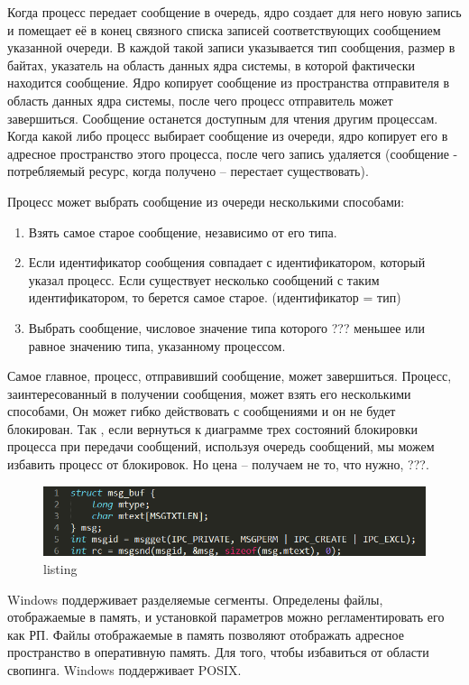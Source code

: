 Когда процесс передает сообщение в очередь, ядро создает для него новую запись и помещает её в конец связного списка записей соответствующих сообщением указанной очереди. В каждой такой записи указывается тип сообщения, размер в байтах, указатель на область данных ядра системы, в которой фактически находится сообщение. Ядро копирует сообщение из пространства отправителя в область данных ядра системы, после чего процесс отправитель может завершиться. Сообщение останется доступным для чтения другим процессам. Когда какой либо процесс выбирает сообщение из очереди, ядро копирует его в адресное пространство этого процесса, после чего запись удаляется (сообщение - потребляемый ресурс, когда получено – перестает существовать). 

Процесс может выбрать сообщение из очереди несколькими способами:
\begin{enumerate}
    \item Взять самое старое сообщение, независимо от его типа.
    \item Если идентификатор сообщения совпадает с идентификатором, который указал процесс. Если существует несколько сообщений с таким идентификатором, то берется самое старое. (идентификатор = тип)
    \item Выбрать сообщение, числовое значение типа которого ??? меньшее или равное значению типа, указанному процессом. 
\end{enumerate} 

Самое главное, процесс, отправивший сообщение, может завершиться. Процесс, заинтересованный в получении сообщения, может взять его несколькими способами, Он может гибко действовать с сообщениями и он не будет блокирован. Так , если вернуться к диаграмме трех состояний блокировки процесса при передачи сообщений, используя очередь сообщений, мы можем избавить процесс от блокировок. Но цена – получаем не то, что нужно, ???.

\begin{figure}[H]
    \centering
    \includegraphics[width=\textwidth]{listing/4.png}
    \caption{listing}
\end{figure}

Windows поддерживает разделяемые сегменты. Определены файлы, отображаемые в память, и установкой параметров можно регламентировать его как РП.  Файлы отображаемые в память позволяют отображать адресное пространство в оперативную память. Для того, чтобы избавиться от области свопинга. Windows поддерживает POSIX.

